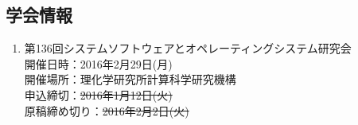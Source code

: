 \documentclass[fleqn, 14pt]{extarticle}
\begin{document}
    \subsection{学会情報} 
    \begin{enumerate}
        \item 第136回システムソフトウェアとオペレーティングシステム研究会\\
            開催日時：2016年2月29日(月)\\
            開催場所：理化学研究所計算科学研究機構\\
            申込締切：\sout{2016年1月12日(火)}\\
            原稿締め切り：\sout{2016年2月2日(火)}
    \end{enumerate}

    
\end{document}
